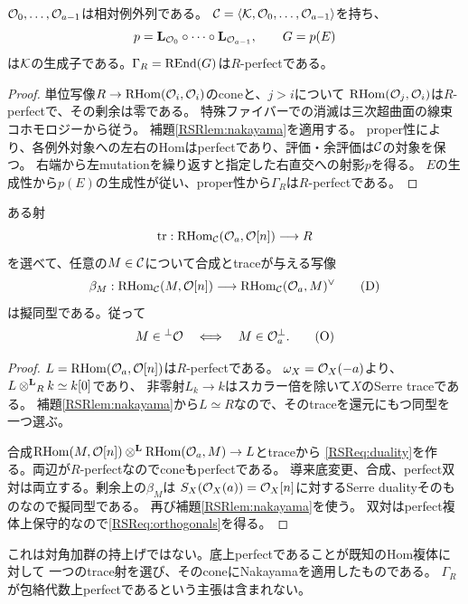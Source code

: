 \begin{lemma}[例外列と残余生成子]\label{RSRlem:exceptional}
$\mathcal O_0,\ldots,\mathcal O_{a-1}$は相対例外列である。
$\mathcal C=\langle\mathcal K,\mathcal O_0,\ldots,\mathcal O_{a-1}\rangle$を持ち、
\[
 p=\mathbf L_{\mathcal O_0}\circ\cdots\circ\mathbf L_{\mathcal O_{a-1}},\qquad G=p(E)
\]
は$\mathcal K$の生成子である。$\Gamma_R=\operatorname{REnd}(G)$は$R$-perfectである。
\end{lemma}
\begin{proof}
単位写像$R\to\operatorname{RHom}(\mathcal O_i,\mathcal O_i)$のconeと、$j>i$について
$\operatorname{RHom}(\mathcal O_j,\mathcal O_i)$は$R$-perfectで、その剰余は零である。
特殊ファイバーでの消滅は三次超曲面の線束コホモロジーから従う。
補題\ref{RSRlem:nakayama}を適用する。
proper性により、各例外対象への左右のHomはperfectであり、評価・余評価は$\mathcal C$の対象を保つ。
右端から左mutationを繰り返すと指定した右直交への射影$p$を得る。
$E$の生成性から$p(E)$の生成性が従い、proper性から$\Gamma_R$は$R$-perfectである。
\end{proof}

\begin{proposition}\label{RSRprop:trace}
ある射
\[
 \operatorname{tr}:\operatorname{RHom}_{\mathcal C}(\mathcal O_a,\mathcal O[n])\longrightarrow R
\]
を選べて、任意の$M\in\mathcal C$について合成とtraceが与える写像
\[
 \beta_M:\operatorname{RHom}_{\mathcal C}(M,\mathcal O[n])
 \longrightarrow\operatorname{RHom}_{\mathcal C}(\mathcal O_a,M)^\vee
 \tag{D}\label{RSReq:duality}
\]
は擬同型である。従って
\[
 M\in{}^\perp\mathcal O\quad\Longleftrightarrow\quad M\in\mathcal O_a^\perp.
 \tag{O}\label{RSReq:orthogonals}
\]
\end{proposition}
\begin{proof}
$L=\operatorname{RHom}(\mathcal O_a,\mathcal O[n])$は$R$-perfectである。
$\omega_X=\mathcal O_X(-a)$より、$L\mathbin{\otimes^{\mathbf L}}_Rk\simeq k[0]$であり、
非零射$L_k\to k$はスカラー倍を除いて$X$のSerre traceである。
補題\ref{RSRlem:nakayama}から$L\simeq R$なので、そのtraceを還元にもつ同型を一つ選ぶ。

合成$\operatorname{RHom}(M,\mathcal O[n])\mathbin{\otimes^{\mathbf L}}\operatorname{RHom}(\mathcal O_a,M)\to L$とtraceから
\eqref{RSReq:duality}を作る。両辺が$R$-perfectなのでconeもperfectである。
導来底変更、合成、perfect双対は両立する。剰余上の$\beta_M$は
$S_X(\mathcal O_X(a))=\mathcal O_X[n]$に対するSerre dualityそのものなので擬同型である。
再び補題\ref{RSRlem:nakayama}を使う。
双対はperfect複体上保守的なので\eqref{RSReq:orthogonals}を得る。
\end{proof}

\begin{remark}
これは対角加群の持上げではない。底上perfectであることが既知のHom複体に対して
一つのtrace射を選び、そのconeにNakayamaを適用したものである。
$\Gamma_R$が包絡代数上perfectであるという主張は含まれない。
\end{remark}

